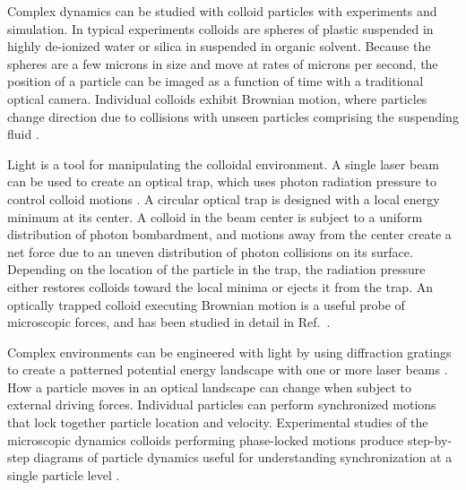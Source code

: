 \documentclass[twocolumn,preprintnumbers,amsmath,amssymb,aps,prx]{revtex4}
\begin{document}

Complex dynamics can be studied with
colloid particles with experiments and simulation.
In typical experiments colloids are spheres of 
plastic suspended in
highly de-ionized water or silica in suspended in organic solvent.
Because 
the spheres are a few microns in size
and move at rates of microns per second,
the position of a particle %
can be imaged as a function of time 
with a traditional optical camera.
Individual colloids exhibit 
Brownian motion,
where particles change direction %
due to 
collisions 
with unseen particles comprising the suspending fluid \cite{}.

Light is a
tool for manipulating the colloidal environment.
A single laser beam can be used to create an optical trap,
which uses 
photon radiation pressure to
control colloid motions \cite{Ashkin1997}.
A circular optical trap is designed
with a local energy minimum 
at its center.
A colloid in the beam center is subject to a
uniform distribution of photon bombardment,
and motions away from the center create a net force
due to an uneven 
distribution of photon collisions on its surface.
Depending on the %
location of the particle in the trap,
the radiation pressure either restores colloids toward the local minima
or ejects it from the trap.
An optically trapped colloid executing Brownian motion
is a useful probe of microscopic forces,
and has been studied in detail in Ref.~\cite{Volpe2013}.

 Complex environments can be
 engineered with light by %
 using diffraction gratings to create a patterned
 potential energy landscape 
 with one or more laser beams \cite{Grier2003}.
 How a particle moves
 in an optical landscape can
 change
 when 
 subject to external driving forces.
 Individual particles can
 perform 
 synchronized %
 motions
 that lock together particle location and velocity.
 Experimental studies of
 the microscopic dynamics 
 colloids performing phase-locked motions
 produce step-by-step diagrams
 of particle dynamics useful for
 understanding synchronization at a single particle level \cite{Juniper2015}.
 
\end{document}
